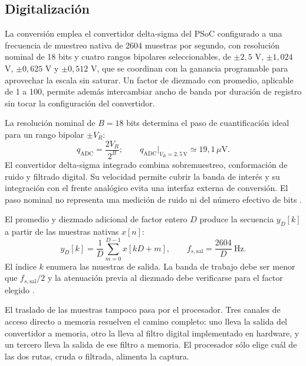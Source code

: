 \subsection{Digitalización}
\label{sec:digitalizacion}

La conversión emplea el convertidor delta-sigma del PSoC configurado a una frecuencia de muestreo nativa de 2604 muestras por segundo, con resolución nominal de 18 bits y cuatro rangos bipolares seleccionables, de $\pm2{,}5$ V, $\pm1{,}024$ V, $\pm0{,}625$ V y $\pm0{,}512$ V, que se coordinan con la ganancia programable para aprovechar la escala sin saturar. Un factor de diezmado con promedio, aplicable de 1 a 100, permite además intercambiar ancho de banda por duración de registro sin tocar la configuración del convertidor.

La resolución nominal de $B=18$ bits determina el paso de cuantificación ideal para un rango bipolar $\pm V_R$:
\begin{equation}
q_{\mathrm{ADC}}=\frac{2V_R}{2^B};
\qquad q_{\mathrm{ADC}}\big|_{V_R=2{,}5\,\mathrm V}
\simeq19{,}1\,\mu\mathrm V.
\label{eq:cuantificacion}
\end{equation}
El convertidor delta-sigma integrado combina sobremuestreo, conformación de ruido y filtrado digital. Su velocidad permite cubrir la banda de interés y su integración con el frente analógico evita una interfaz externa de conversión. El paso nominal no representa una medición de ruido ni del número efectivo de bits .

El promedio y diezmado adicional de factor entero $D$ produce la secuencia $y_D[k]$ a partir de las muestras nativas $x[n]$:
\begin{equation}
y_D[k]=\frac{1}{D}\sum_{m=0}^{D-1}x[kD+m],
\qquad f_{s,\mathrm{sal}}=\frac{2604}{D}\ \mathrm{Hz}.
\label{eq:diezmado}
\end{equation}
El índice $k$ enumera las muestras de salida. La banda de trabajo debe ser menor que $f_{s,\mathrm{sal}}/2$ y la atenuación previa al diezmado debe verificarse para el factor elegido .

El traslado de las muestras tampoco pasa por el procesador. Tres canales de acceso directo a memoria resuelven el camino completo: uno lleva la salida del convertidor a memoria, otro la lleva al filtro digital implementado en hardware, y un tercero lleva la salida de ese filtro a memoria. El procesador sólo elige cuál de las dos rutas, cruda o filtrada, alimenta la captura.

